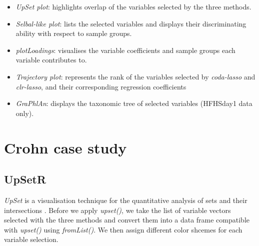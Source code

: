 \documentclass[openany]{book}
\providecommand{\tightlist}{%
  \setlength{\itemsep}{0pt}\setlength{\parskip}{0pt}}
\begin{document}
\begin{itemize}
\tightlist
\item
  \emph{UpSet plot}: highlights overlap of the variables selected by the
  three methods.
\item
  \emph{Selbal-like plot}: lists the selected variables and displays
  their discriminating ability with respect to sample groups.
\item
  \emph{plotLoadings}: visualises the variable coefficients and sample
  groups each variable contributes to.
\item
  \emph{Trajectory plot}: represents the rank of the variables selected
  by \emph{coda-lasso} and \emph{clr-lasso}, and their corresponding
  regression coefficients
\item
  \emph{GraPhlAn}: displays the taxonomic tree of selected variables
  (HFHSday1 data only).
\end{itemize}

\section{Crohn case study}\label{crohn-case-study-3}

\subsection{UpSetR}\label{upsetr}

\emph{UpSet} is a visualisation technique for the quantitative analysis
of sets and their intersections \citep{lex2014upset}. Before we apply
\emph{upset()}, we take the list of variable vectors selected with the
three methods and convert them into a data frame compatible with
\emph{upset()} using \emph{fromList()}. We then assign different color
shcemes for each variable selection.
\end{document}
